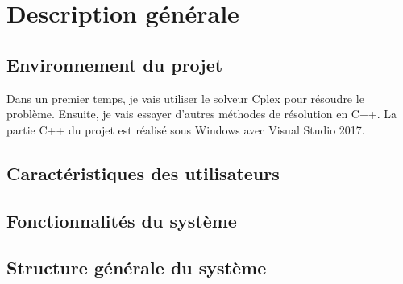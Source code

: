 \chapter{Description générale}

\section{Environnement du projet}
Dans un premier temps, je vais utiliser le solveur Cplex pour résoudre le problème.
Ensuite, je vais essayer d'autres méthodes de résolution en C++.
La partie C++ du projet est réalisé sous Windows avec Visual Studio 2017.
\section{Caractéristiques des utilisateurs}

\section{Fonctionnalités du système}

\section{Structure générale du système}